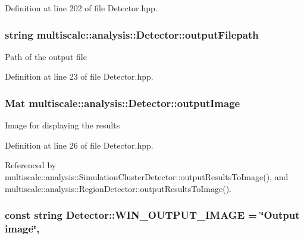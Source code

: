 Definition at line 202 of file Detector.\-hpp.

\hypertarget{classmultiscale_1_1analysis_1_1Detector_a1a83df16d8afd347c0e1c9ddc41c9bee}{
\subsubsection[{output\-Filepath}]{\setlength{\rightskip}{0pt plus 5cm}string multiscale\-::analysis\-::\-Detector\-::output\-Filepath\hspace{0.3cm}{\ttfamily [protected]}}}\label{classmultiscale_1_1analysis_1_1Detector_a1a83df16d8afd347c0e1c9ddc41c9bee}
Path of the output file 

Definition at line 23 of file Detector.\-hpp.

\hypertarget{classmultiscale_1_1analysis_1_1Detector_a144e080a3af03c9bf3d8a80315823c86}{
\subsubsection[{output\-Image}]{\setlength{\rightskip}{0pt plus 5cm}Mat multiscale\-::analysis\-::\-Detector\-::output\-Image\hspace{0.3cm}{\ttfamily [protected]}}}\label{classmultiscale_1_1analysis_1_1Detector_a144e080a3af03c9bf3d8a80315823c86}
Image for displaying the results 

Definition at line 26 of file Detector.\-hpp.



Referenced by multiscale\-::analysis\-::\-Simulation\-Cluster\-Detector\-::output\-Results\-To\-Image(), and multiscale\-::analysis\-::\-Region\-Detector\-::output\-Results\-To\-Image().

\hypertarget{classmultiscale_1_1analysis_1_1Detector_a883b5de8d273a2bfab31e45bc285c78d}{
\subsubsection[{W\-I\-N\-\_\-\-O\-U\-T\-P\-U\-T\-\_\-\-I\-M\-A\-G\-E}]{\setlength{\rightskip}{0pt plus 5cm}const string Detector\-::\-W\-I\-N\-\_\-\-O\-U\-T\-P\-U\-T\-\_\-\-I\-M\-A\-G\-E = \char`\"{}Output {\bf image}\char`\"{}\hspace{0.3cm}{\ttfamily [static]}, {\ttfamily [protected]}}}\label{classmultiscale_1_1analysis_1_1Detector_a883b5de8d273a2bfab31e45bc285c78d}


